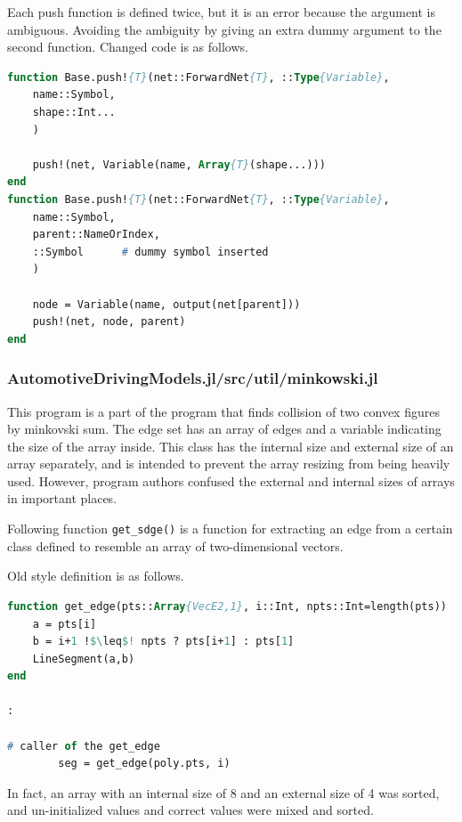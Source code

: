 Each push function is defined twice, but it is an error because the argument is ambiguous. Avoiding the ambiguity by giving an extra dummy argument to the second function.
Changed code is as follows.

\begin{lstlisting}[caption=Changed code 
,label=list:julia_06_forwardnets, language=Pascal, frame=single]
function Base.push!{T}(net::ForwardNet{T}, ::Type{Variable},
    name::Symbol,
    shape::Int...
    )

    push!(net, Variable(name, Array{T}(shape...)))
end
function Base.push!{T}(net::ForwardNet{T}, ::Type{Variable},
    name::Symbol,
    parent::NameOrIndex,
    ::Symbol      # dummy symbol inserted
    )

    node = Variable(name, output(net[parent]))
    push!(net, node, parent)
end
\end{lstlisting}

\subsubsection{AutomotiveDrivingModels.jl/src/util/minkowski.jl}

This program is a part of the program that finds collision of two convex figures by minkovski sum.
The edge set has an array of edges and a variable indicating the size of the array inside. 
This class has the internal size and external size of an array separately, and is intended to prevent the array resizing from being heavily used.
However, program authors confused the external and internal sizes of arrays in important places.

Following function {\tt get\_sdge()} is a function for extracting an edge from a certain class defined to resemble an array of two-dimensional vectors.

Old style definition is as follows.

\begin{lstlisting}[caption=Original code 
,label=list:julia_05_automotive, escapechar=!, language=Pascal, frame=single]
function get_edge(pts::Array{VecE2,1}, i::Int, npts::Int=length(pts))
    a = pts[i]
    b = i+1 !$\leq$! npts ? pts[i+1] : pts[1]
    LineSegment(a,b)
end

:

# caller of the get_edge
        seg = get_edge(poly.pts, i)

\end{lstlisting}

In fact, an array with an internal size of 8 and an external size of 4 was sorted, and un-initialized values and correct values were mixed and sorted.

